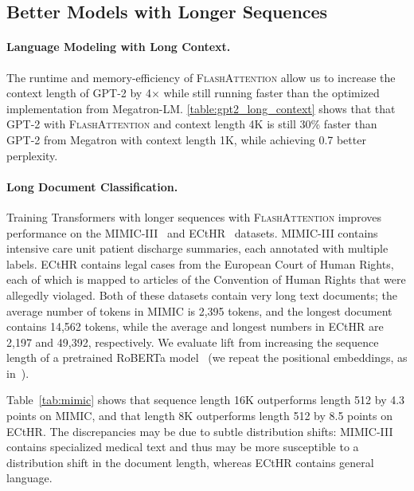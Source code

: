 \subsection{Better Models with Longer Sequences}
\label{ssec:exp_long_sequences}

\paragraph{Language Modeling with Long Context.} The runtime and memory-efficiency of \textsc{FlashAttention} allow us to increase the context length of GPT-2 by 4$\times$ while still running faster than the optimized implementation from Megatron-LM.
\ref{table:gpt2_long_context} shows that that GPT-2 with \textsc{FlashAttention} and context length 4K is still 30\% faster than GPT-2 from Megatron with context length 1K, while achieving 0.7 better perplexity.

\paragraph{Long Document Classification.} Training Transformers with longer sequences with \textsc{FlashAttention} improves performance on the MIMIC-III~\citep{johnson2016mimic} and ECtHR~\citep{chalkidis-etal-2019-neural, chalkidis-et-al-2021-ecthr} datasets. MIMIC-III contains intensive care unit patient discharge summaries, each annotated with multiple labels. ECtHR contains legal cases from the European Court of Human Rights, each of which is mapped to articles of the Convention of Human Rights that were allegedly violaged. Both of these datasets contain very long text documents; the average number of tokens in MIMIC is 2,395 tokens, and the longest document contains 14,562 tokens, while the average and longest numbers in ECtHR are 2,197 and 49,392, respectively. We evaluate lift from increasing the sequence length of a pretrained RoBERTa model~\citep{liu2019roberta} (we repeat the positional embeddings, as in~\citet{beltagy2020longformer}).

Table~\ref{tab:mimic} shows that sequence length 16K outperforms length 512 by 4.3 points on MIMIC, and that  length 8K outperforms length 512 by 8.5 points on ECtHR. The discrepancies may be due to subtle distribution shifts: MIMIC-III contains specialized medical text and thus may be more susceptible to a distribution shift in the document length, whereas ECtHR contains general language.

